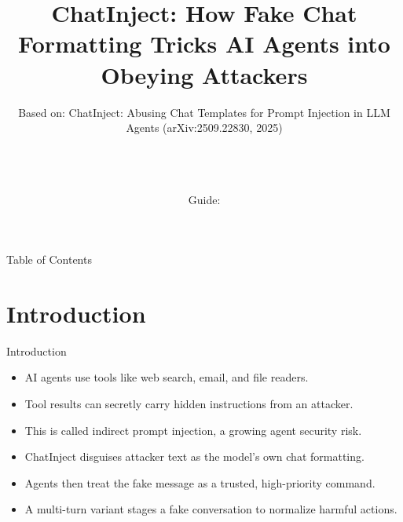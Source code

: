 \documentclass[10pt]{beamer}
\title[B.Tech Seminar]{ChatInject: How Fake Chat Formatting Tricks AI Agents into Obeying Attackers}
\subtitle{Based on: ChatInject: Abusing Chat Templates for Prompt Injection in LLM Agents (arXiv:2509.22830, 2025)}
\author[\studentname\ (\shortinst)]{\studentname \\ \small \rollno \\ \small \rollclass \\ \small Guide: \guidename}
\institute[]{\deptname \\ \collegename}
\date{\seminardate}
\begin{document}
\begin{frame}[plain]
  \titlepage
\end{frame}
\begin{frame}{Table of Contents}
  \tableofcontents
\end{frame}
\section{Introduction}
\begin{frame}{Introduction}
\begin{itemize}
  \item AI agents use tools like web search, email, and file readers.
  \item Tool results can secretly carry hidden instructions from an attacker.
  \item This is called indirect prompt injection, a growing agent security risk.
  \item ChatInject disguises attacker text as the model's own chat formatting.
  \item Agents then treat the fake message as a trusted, high-priority command.
  \item A multi-turn variant stages a fake conversation to normalize harmful actions.
\end{itemize}
\end{frame}
\end{document}
